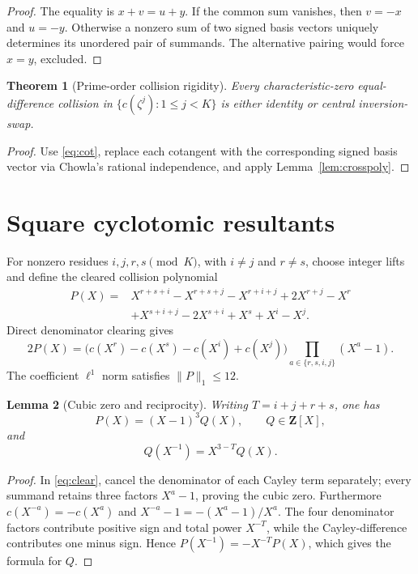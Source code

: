 \documentclass[11pt]{article}
\newtheorem{theorem}{Theorem}[section]
\newtheorem{lemma}[theorem]{Lemma}
\begin{document}
\begin{proof}
The equality is $x+v=u+y$.  If the common sum vanishes, then
$v=-x$ and $u=-y$.  Otherwise a nonzero sum of two signed basis vectors
uniquely determines its unordered pair of summands.  The alternative pairing
would force $x=y$, excluded.
\end{proof}

\begin{theorem}[Prime-order collision rigidity]\label{thm:rigidity}
Every characteristic-zero equal-difference collision in
$\{c(\zeta^j):1\le j<K\}$ is either identity or central inversion-swap.
\end{theorem}

\begin{proof}
Use \eqref{eq:cot}, replace each cotangent with the corresponding signed basis
vector via Chowla's rational independence, and apply
Lemma~\ref{lem:crosspoly}.
\end{proof}

\section{Square cyclotomic resultants}

For nonzero residues $i,j,r,s\pmod K$, with $i\ne j$ and $r\ne s$, choose
integer lifts and define the cleared collision polynomial
\begin{align}\label{eq:Pdef}
P(X)={}&X^{r+s+i}-X^{r+s+j}-X^{r+i+j}+2X^{r+j}-X^r\\
&+X^{s+i+j}-2X^{s+i}+X^s+X^i-X^j.\nonumber
\end{align}
Direct denominator clearing gives
\begin{equation}\label{eq:clear}
2P(X)=\bigl(c(X^r)-c(X^s)-c(X^i)+c(X^j)\bigr)
\prod_{a\in\{r,s,i,j\}}(X^a-1).
\end{equation}
The coefficient $\ell^1$ norm satisfies $\|P\|_1\le12$.

\begin{lemma}[Cubic zero and reciprocity]\label{lem:reciprocity}
Writing $T=i+j+r+s$, one has
\[
P(X)=(X-1)^3Q(X),\qquad Q\in\mathbf Z[X],
\]
and
\[
Q(X^{-1})=X^{3-T}Q(X).
\]
\end{lemma}

\begin{proof}
In \eqref{eq:clear}, cancel the denominator of each Cayley term separately;
every summand retains three factors $X^a-1$, proving the cubic zero.
Furthermore $c(X^{-a})=-c(X^a)$ and
$X^{-a}-1=-(X^a-1)/X^a$.  The four denominator factors contribute positive
sign and total power $X^{-T}$, while the Cayley-difference contributes one
minus sign.  Hence
$P(X^{-1})=-X^{-T}P(X)$, which gives the formula for $Q$.
\end{proof}
\end{document}
